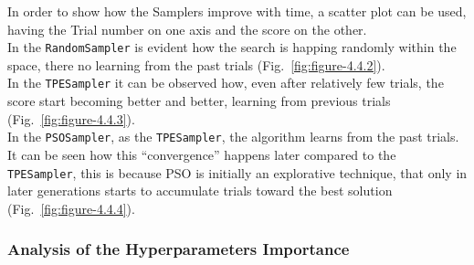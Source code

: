 In order to show how the Samplers improve with time, a scatter plot can be used, having the Trial number on one axis and the score on the other.
\\[0.3cm]In the \texttt{RandomSampler} is evident how the search is happing randomly within the space, there no learning from the past trials (Fig.~\ref{fig:figure-4.4.2}).
\\[0.3cm]In the \texttt{TPESampler} it can be observed how, even after relatively few trials, the score start becoming better and better, learning from previous trials (Fig.~\ref{fig:figure-4.4.3}).
\\[0.3cm]In the \texttt{PSOSampler}, as the \texttt{TPESampler}, the algorithm learns from the past trials. It can be seen how this “convergence” happens later compared to the \texttt{TPESampler}, this is because PSO is initially an explorative technique, that only in later generations starts to accumulate trials toward the best solution (Fig.~\ref{fig:figure-4.4.4}).
% 
% 
% 

\subsubsection{Analysis of the Hyperparameters Importance}

